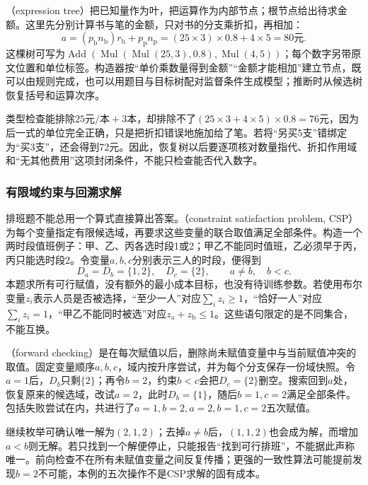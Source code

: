 （expression tree）把已知量作为叶，把运算作为内部节点；根节点给出待求金额。这里先分别计算书与笔的金额，只对书的分支乘折扣，再相加：
\begin{equation}
  a=(p_{\mathrm{b}}n_{\mathrm{b}})r_{\mathrm{b}}
      +p_{\mathrm{p}}n_{\mathrm{p}}
    =(25\times3)\times0.8+4\times5=80\text{元}.
  \label{eq:nlp-execution-price}
\end{equation}
这棵树可写为$\operatorname{Add}(\operatorname{Mul}(\operatorname{Mul}(25,3),0.8),\operatorname{Mul}(4,5))$；每个数字另带原文位置和单位标签。构造器按“单价乘数量得到金额”“金额才能相加”建立节点，既可以由规则完成，也可以用题目与目标树配对监督条件生成模型；推断时从候选树恢复括号和运算次序。

类型检查能排除$25\text{元/本}+3\text{本}$，却排除不了$(25\times3+4\times5)\times0.8=76$元，因为后一式的单位完全正确，只是把折扣错误地施加给了笔。若将“另买5支”错绑定为“买3支”，还会得到72元。因此，恢复树以后要逐项核对数量指代、折扣作用域和“无其他费用”这项封闭条件，不能只检查能否代入数字。

\subsubsection{有限域约束与回溯求解}
\label{sec:nlp-execution-csp}

排班题不能总用一个算式直接算出答案。（constraint satisfaction problem, CSP）为每个变量指定有限候选域，再要求这些变量的联合取值满足全部条件。构造一个两时段值班例子：甲、乙、丙各选时段1或2；甲乙不能同时值班，乙必须早于丙，丙只能选时段2。令变量$a,b,c$分别表示三人的时段，便得到
\[
 D_a=D_b=\{1,2\},\quad D_c=\{2\},\qquad a\ne b,\quad b<c.
\]
本题求所有可行赋值，没有额外的最小成本目标，也没有待训练参数。若使用布尔变量$z_i$表示人员是否被选择，“至少一人”对应$\sum_i z_i\geq1$，“恰好一人”对应$\sum_i z_i=1$，“甲乙不能同时被选”对应$z_{\mathrm{a}}+z_{\mathrm{b}}\leq1$。这些语句限定的是不同集合，不能互换。

（forward checking）是在每次赋值以后，删除尚未赋值变量中与当前赋值冲突的取值。固定变量顺序$a,b,c$，域内按升序尝试，并为每个分支保存一份域快照。令$a=1$后，$D_b$只剩$\{2\}$；再令$b=2$，约束$b<c$会把$D_c=\{2\}$删空。搜索回到$a$处，恢复原来的候选域，改试$a=2$，此时$D_b=\{1\}$，随后$b=1,c=2$满足全部条件。包括失败尝试在内，共进行了$a=1,b=2,a=2,b=1,c=2$五次赋值。

继续枚举可确认唯一解为$(2,1,2)$；去掉$a\ne b$后，$(1,1,2)$也会成为解，而增加$a<b$则无解。若只找到一个解便停止，只能报告“找到可行排班”，不能据此声称唯一。前向检查不在所有未赋值变量之间反复传播；更强的一致性算法可能提前发现$b=2$不可能，本例的五次操作不是CSP求解的固有成本。

